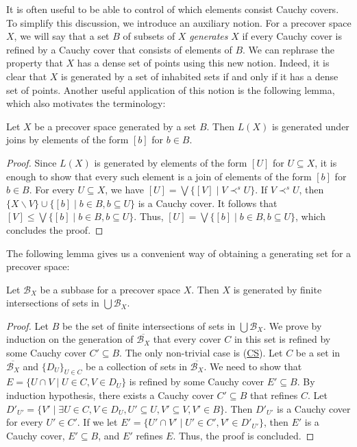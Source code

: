\documentclass[reqno]{amsart}
\newcommand{\axref}[1]{(\hyperref[ax:#1]{#1})}
\theoremstyle{definition}
\theoremstyle{remark}
\numberwithin{figure}{section}
\newcommand{\rb}{\prec}
\begin{document}
It is often useful to be able to control of which elements consist Cauchy covers.
To simplify this discussion, we introduce an auxiliary notion.
For a precover space $X$, we will say that a set $B$ of subsets of $X$ \emph{generates} $X$ if every Cauchy cover is refined by a Cauchy cover that consists of elements of $B$.
We can rephrase the property that $X$ has a dense set of points using this new notion.
Indeed, it is clear that $X$ is generated by a set of inhabited sets if and only if it has a dense set of points.
Another useful application of this notion is the following lemma, which also motivates the terminology:

\begin{lem}
Let $X$ be a precover space generated by a set $B$.
Then $L(X)$ is generated under joins by elements of the form $[b]$ for $b \in B$.
\end{lem}
\begin{proof}
Since $L(X)$ is generated by elements of the form $[U]$ for $U \subseteq X$, it is enough to show that every such element is a join of elements of the form $[b]$ for $b \in B$.
For every $U \subseteq X$, we have $[U] = \bigvee \{ [V] \mid V \rb^s U \}$.
If $V \rb^s U$, then $\{ X \backslash V \} \cup \{ [b] \mid b \in B, b \subseteq U \}$ is a Cauchy cover.
It follows that $[V] \leq \bigvee \{ [b] \mid b \in B, b \subseteq U \}$.
Thus, $[U] = \bigvee \{ [b] \mid b \in B, b \subseteq U \}$, which concludes the proof.
\end{proof}

The following lemma gives us a convenient way of obtaining a generating set for a precover space:

\begin{lem}
Let $\mathcal{B}_X$ be a subbase for a precover space $X$.
Then $X$ is generated by finite intersections of sets in $\bigcup \mathcal{B}_X$.
\end{lem}
\begin{proof}
Let $B$ be the set of finite intersections of sets in $\bigcup \mathcal{B}_X$.
We prove by induction on the generation of $\overline{\mathcal{B}_X}$ that every cover $C$ in this set is refined by some Cauchy cover $C' \subseteq B$.
The only non-trivial case is \axref{CS}.
Let $C$ be a set in $\overline{\mathcal{B}_X}$ and $\{ D_U \}_{U \in C}$ be a collection of sets in $\overline{\mathcal{B}_X}$.
We need to show that $E = \{ U \cap V \mid U \in C, V \in D_U \}$ is refined by some Cauchy cover $E' \subseteq B$.
By induction hypothesis, there exists a Cauchy cover $C' \subseteq B$ that refines $C$.
Let $D'_{U'} = \{ V' \mid \exists U \in C, V \in D_U, U' \subseteq U, V' \subseteq V, V' \in B \}$.
Then $D'_{U'}$ is a Cauchy cover for every $U' \in C'$.
If we let $E' = \{ U' \cap V' \mid U' \in C', V' \in D'_{U'} \}$, then $E'$ is a Cauchy cover, $E' \subseteq B$, and $E'$ refines $E$.
Thus, the proof is concluded.
\end{proof}
\end{document}
